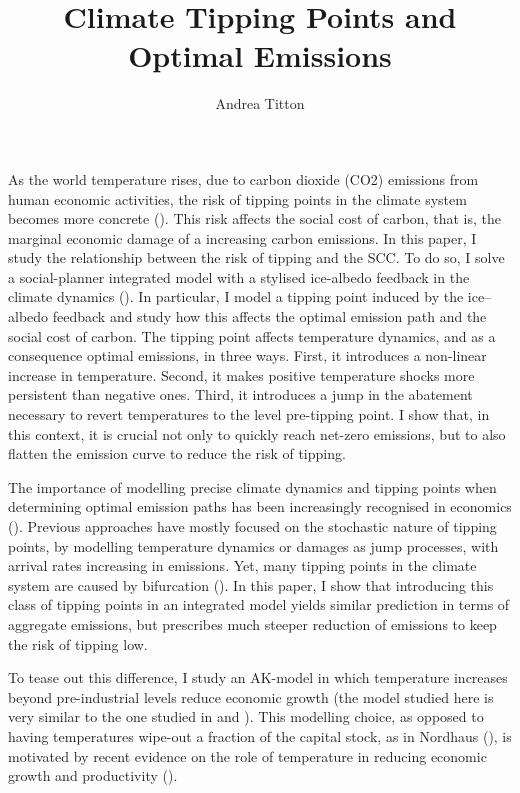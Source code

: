 \documentclass[american, abstract=off, draft]{scrartcl}
\author{Andrea Titton}
\title{Climate Tipping Points and\\ Optimal Emissions}
\begin{document}
\maketitle

As the world temperature rises, due to carbon dioxide (CO2) emissions from human economic activities, the risk of tipping points in the climate system becomes more concrete (\cite{ashwin_extreme_2020,sledd_cloudier_2021}). This risk affects the social cost of carbon, that is, the marginal economic damage of a increasing carbon emissions. In this paper, I study the relationship between the risk of tipping and the SCC. To do so, I solve a social-planner integrated model with a stylised ice-albedo feedback in the climate dynamics (\cite{hogg_glacial_2008,ashwin_tipping_2012}). In particular, I model a tipping point induced by the ice–albedo feedback and study how this affects the optimal emission path and the social cost of carbon. The tipping point affects temperature dynamics, and as a consequence optimal emissions, in three ways. First, it introduces a non-linear increase in temperature. Second, it makes positive temperature shocks more persistent than negative ones. Third, it introduces a jump in the abatement necessary to revert temperatures to the level pre-tipping point. I show that, in this context, it is crucial not only to quickly reach net-zero emissions, but to also flatten the emission curve to reduce the risk of tipping.

The importance of modelling precise climate dynamics and tipping points when determining optimal emission paths has been increasingly recognised in economics (\cite{van_den_bremer_risk-adjusted_2021,dietz_economic_2021,dietz_are_2020,taconet_social_2021,lontzek_stochastic_2015}). Previous approaches have mostly focused on the stochastic nature of tipping points, by modelling temperature dynamics or damages as jump processes, with arrival rates increasing in emissions. Yet, many tipping points in the climate system are caused by bifurcation (\cite{ashwin_extreme_2020,ashwin_tipping_2012}). In this paper, I show that introducing this class of tipping points in an integrated model yields similar prediction in terms of aggregate emissions, but prescribes much steeper reduction of emissions to keep the risk of tipping low.

To tease out this difference, I study an AK-model in which temperature increases beyond pre-industrial levels reduce economic growth (the model studied here is very similar to the one studied in \cite{pindyck_economic_2013} and \cite{hambel_optimal_2021}). This modelling choice, as opposed to having temperatures wipe-out a fraction of the capital stock, as in Nordhaus (\citeyear{nordhaus_estimates_2014,nordhaus_question_2008,nordhaus_revisiting_2017}), is motivated by recent evidence on the role of temperature in reducing economic growth and productivity (\cite{burke_global_2015}).
\end{document}
